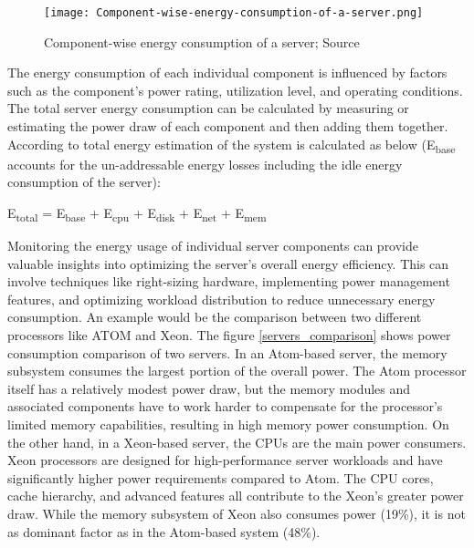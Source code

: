 \documentclass[
  a4paper,  %
  twoside,  %
  bibliography=totoc,
  headsepline,
  cleardoublepage=empty,
  parskip=half,
  draft=false
]{scrbook}
\begin{document}
\begin{figure}
	\centering
	\texttt{[image: Component-wise-energy-consumption-of-a-server.png]}
	\caption{Component-wise energy consumption of a server; Source\cite{ahmed2021review}}
	\label{component_wise_consumption}
\end{figure}

The energy consumption of each individual component is influenced by factors such as the component's power rating, utilization level, and operating conditions. The total server energy consumption can be calculated by measuring or estimating the power draw of each component and then adding them together. According to \cite{chatzipapas2015challenge} total energy estimation of the system is calculated as below (E\textsubscript{base} accounts for the un-addressable energy losses including the idle energy consumption of the server):

\begin{center}
	E\textsubscript{total} = E\textsubscript{base} + E\textsubscript{cpu} + E\textsubscript{disk} + E\textsubscript{net} + E\textsubscript{mem}
\end{center}

Monitoring the energy usage of individual server components can provide valuable insights into optimizing the server's overall energy efficiency. This can involve techniques like right-sizing hardware, implementing power management features, and optimizing workload distribution to reduce unnecessary energy consumption\cite{LIN201847}. An example would be the comparison between two different processors like ATOM and Xeon\cite{iccusaIntelAtom}. The figure \ref{servers_comparison} shows power consumption comparison of two servers.
In an Atom-based server, the memory subsystem consumes the largest portion of the overall power. The Atom processor itself has a relatively modest power draw, but the memory modules and associated components have to work harder to compensate for the processor's limited memory capabilities, resulting in high memory power consumption\cite{turley2014white}. On the other hand, in a Xeon-based server, the CPUs are the main power consumers. Xeon processors are designed for high-performance server workloads and have significantly higher power requirements compared to Atom. The CPU cores, cache hierarchy, and advanced features all contribute to the Xeon's greater power draw. While the memory subsystem of Xeon also consumes power (19\%), it is not as dominant factor as in the Atom-based system (48\%)\cite{servethehomeMemoryBandwidth}.
\end{document}
